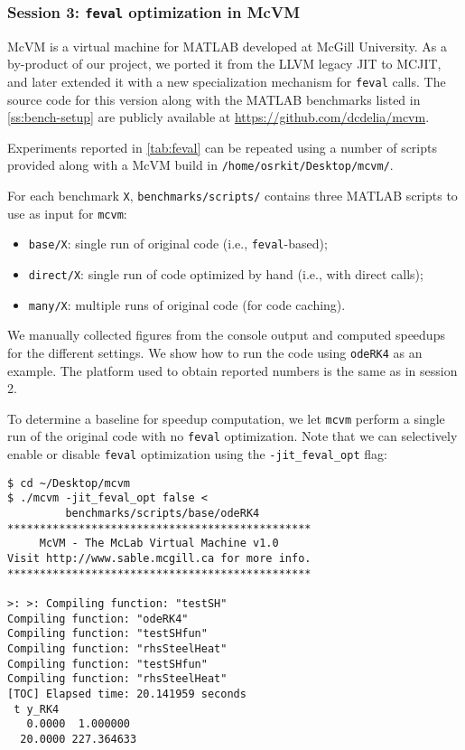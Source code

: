 
\subsubsection{Session 3: {\tt feval} optimization in McVM}

McVM is a virtual machine for MATLAB developed at McGill University. As a by-product of our project, we ported it from the LLVM legacy JIT to MCJIT, and later extended it with a new specialization mechanism for {\tt feval} calls. The source code for this version along with the MATLAB benchmarks listed in \mysection\ref{ss:bench-setup} are publicly available at \url{https://github.com/dcdelia/mcvm}.

Experiments reported in \mytable\ref{tab:feval} can be repeated using a number of scripts provided along with a McVM build in {\small\tt /home/osrkit/Desktop/mcvm/}. %

For each benchmark {\tt X}, {\small\tt benchmarks/scripts/} contains three MATLAB scripts to use as input for {\tt mcvm}:

\begin{itemize}[parsep=0pt]
\item {\tt base/X}: single run of original code (i.e., {\tt feval}-based);
\item {\tt direct/X}: single run of code optimized by hand (i.e., with direct calls);
\item {\tt many/X}: multiple runs of original code (for code caching).
\end{itemize}

\noindent We manually collected figures from the console output and computed speedups for the different settings. We show how to run the code using {\tt odeRK4} as an example. The platform used to obtain reported numbers is the same as in session 2.

To determine a baseline for speedup computation, we let {\tt mcvm} perform a single run of the original code with no {\tt feval} optimization. Note that we can selectively enable or disable {\tt feval} optimization using the {\tt -jit\_feval\_opt} flag:

\begin{small}
\begin{verbatim}
$ cd ~/Desktop/mcvm
$ ./mcvm -jit_feval_opt false <
         benchmarks/scripts/base/odeRK4
***********************************************
     McVM - The McLab Virtual Machine v1.0
Visit http://www.sable.mcgill.ca for more info.
***********************************************

>: >: Compiling function: "testSH"
Compiling function: "odeRK4"
Compiling function: "testSHfun"
Compiling function: "rhsSteelHeat"
Compiling function: "testSHfun"
Compiling function: "rhsSteelHeat"
[TOC] Elapsed time: 20.141959 seconds
 t y_RK4
   0.0000  1.000000
  20.0000 227.364633
\end{verbatim}
\end{small}

